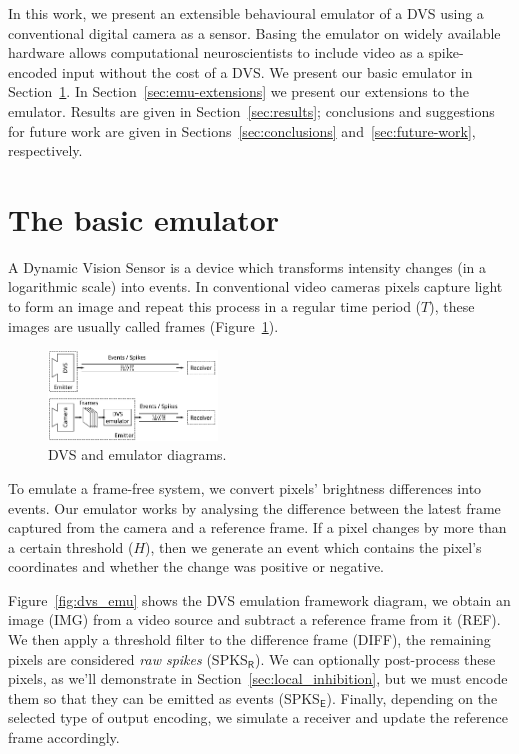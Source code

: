 \documentclass[conference]{IEEEtran}
\begin{document}
In this work, we present an extensible behavioural emulator of a DVS using a conventional digital camera as a sensor. Basing the emulator on widely available hardware allows computational neuroscientists to include video as a spike-encoded input without the cost of a DVS. We present our basic emulator in Section~\ref{sec:basic-emulator}. In Section~\ref{sec:emu-extensions} we present our extensions to the emulator. Results are given in Section~\ref{sec:results}; conclusions and suggestions for future work are given in Sections~\ref{sec:conclusions} and~\ref{sec:future-work}, respectively.


\section{The basic emulator}
\label{sec:basic-emulator}
A Dynamic Vision Sensor is a device which transforms intensity changes (in a logarithmic scale) into events. In conventional video cameras pixels capture light to form an image and repeat this process in a regular time period ($T$), these images are usually called frames (Figure~\ref{fig:dvs_vs_emu}).

\begin{figure}[htb]
  \centering
  \includegraphics[width=0.4\textwidth]{dvs_vs_emu_diagram}
  \caption{DVS and emulator diagrams.}
  \label{fig:dvs_vs_emu}
\end{figure}

To emulate a frame-free system, we convert pixels' brightness differences into events. Our emulator works by analysing the difference between the latest frame captured from the camera and a reference frame. If a pixel changes by more than a certain threshold ($H$), then we generate an event which contains the pixel's coordinates and whether the change was positive or negative. 

Figure~\ref{fig:dvs_emu} shows the DVS emulation framework diagram, we obtain an image (\textsf{\footnotesize IMG}) from a video source and subtract a reference frame from it  (\textsf{\footnotesize REF}). We then apply a threshold filter to the difference frame (\textsf{\footnotesize DIFF}), the remaining pixels are considered \textit{raw spikes} (\textsf{\footnotesize SPKS}$\mathsf{_R}$). We can optionally post-process these pixels, as we'll demonstrate in Section~\ref{sec:local_inhibition}, but we must encode them so that they can be emitted as events (\textsf{\footnotesize SPKS}$\mathsf{_E}$). Finally, depending on the selected type of output encoding, we simulate a receiver and update the reference frame accordingly. 
\end{document}
